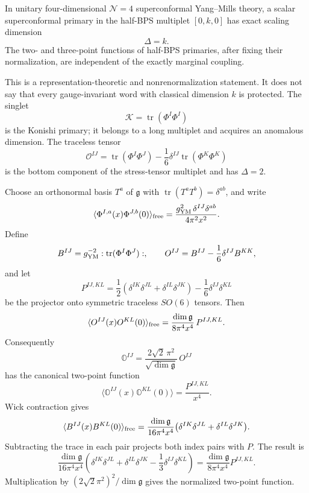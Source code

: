 \begin{quotedtheorem}
\label{qthm:n4-half-bps-protection}
In unitary four-dimensional \(\mathcal N=4\) superconformal Yang--Mills
theory, a scalar superconformal primary in the half-BPS multiplet
\([0,k,0]\) has exact scaling dimension
\[
  \Delta=k.
\]
The two- and three-point functions of half-BPS primaries, after fixing their
normalization, are independent of the exactly marginal coupling.
\end{quotedtheorem}

This is a representation-theoretic and nonrenormalization statement.  It does
not say that every gauge-invariant word with classical dimension \(k\) is
protected.  The singlet
\[
  \mathcal K=\operatorname{tr}(\Phi^I\Phi^I)
\]
is the Konishi primary; it belongs to a long multiplet and acquires an
anomalous dimension.  The traceless tensor
\[
  \mathcal O^{IJ}
  =
  \operatorname{tr}(\Phi^I\Phi^J)
  -\frac16\delta^{IJ}\operatorname{tr}(\Phi^K\Phi^K)
\]
is the bottom component of the stress-tensor multiplet and has
\(\Delta=2\).

\begin{remark}
\label{prop:n4-stress-tensor-multiplet-normalization}
Choose an orthonormal basis \(T^a\) of \(\mathfrak g\) with
\(\operatorname{tr}(T^aT^b)=\delta^{ab}\), and write
\[
  \langle\Phi^{I,a}(x)\Phi^{J,b}(0)\rangle_{\rm free}
  =
  \frac{g_{\rm YM}^2\,\delta^{IJ}\delta^{ab}}{4\pi^2 x^2}.
\]
Define
\[
  B^{IJ}=g_{\rm YM}^{-2}:\operatorname{tr}(\Phi^I\Phi^J):,
  \qquad
  O^{IJ}=B^{IJ}-\frac16\delta^{IJ}B^{KK},
\]
and let
\[
  P^{IJ,KL}
  =
  \frac12(\delta^{IK}\delta^{JL}+\delta^{IL}\delta^{JK})
  -\frac16\delta^{IJ}\delta^{KL}
\]
be the projector onto symmetric traceless \(SO(6)\) tensors.  Then
\[
  \langle O^{IJ}(x)O^{KL}(0)\rangle_{\rm free}
  =
  \frac{\dim\mathfrak g}{8\pi^4 x^4}\,P^{IJ,KL}.
\]
Consequently
\[
  \mathbb O^{IJ}
  =
  \frac{2\sqrt2\,\pi^2}{\sqrt{\dim\mathfrak g}}\,O^{IJ}
\]
has the canonical two-point function
\[
  \langle\mathbb O^{IJ}(x)\mathbb O^{KL}(0)\rangle
  =
  \frac{P^{IJ,KL}}{x^4}.
\]
Wick contraction gives
\[
  \langle B^{IJ}(x)B^{KL}(0)\rangle_{\rm free}
  =
  \frac{\dim\mathfrak g}{16\pi^4x^4}
  \bigl(\delta^{IK}\delta^{JL}+\delta^{IL}\delta^{JK}\bigr).
\]
Subtracting the trace in each pair projects both index pairs with \(P\).  The
result is
\[
  \frac{\dim\mathfrak g}{16\pi^4x^4}
  \left(
  \delta^{IK}\delta^{JL}
  +\delta^{IL}\delta^{JK}
  -\frac13\delta^{IJ}\delta^{KL}
  \right)
  =
  \frac{\dim\mathfrak g}{8\pi^4x^4}P^{IJ,KL}.
\]
Multiplication by \((2\sqrt2\pi^2)^2/\dim\mathfrak g\) gives the normalized
two-point function.
\end{remark}

